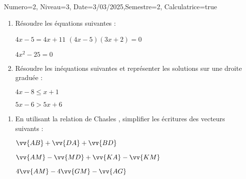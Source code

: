 \documentclass[a4paper,12pt]{article}
\begin{document}
\begin{Maquette}[DS]{Numero=2, Niveau=3, Date=3/03/2025,Semestre=2, Calculatrice=true}

\begin{exercice}
\begin{enumerate}
\item{} Résoudre les équations suivantes :
\begin{multicols}{3}
$4x-5=4x+11$ \newline
\anserline[6]
\columnbreak
$(4x-5)(3x+2)=0$\newline
\anserline[6]
\columnbreak

$4x^{2}-25=0$\newline
\anserline[6]
\end{multicols}
\item{} Résoudre les inéquations suivantes et représenter les solutions sur une droite graduée :
\begin{multicols}{2}
$4x-8\leq x+1$ \newline
\anserline[6]
\columnbreak

$5x-6 > 5x+6$\newline
\anserline[6]
\end{multicols}
\end{enumerate}
\end{exercice}

\begin{exercice}
\begin{enumerate}
\item{} En utilisant la relation de Chasles , simplifier les écritures des vecteurs suivants :
\begin{multicols}{3}
\(
\vv{AB}+\vv{DA}+\vv{BD}\)\newline
\anserline[4]
\columnbreak

\( \vv{AM}-\vv{MD}+\vv{KA}-\vv{KM}\)\newline
\anserline[4]
\columnbreak

\( 4\vv{AM}-4\vv{GM}-\vv{AG}\)\newline
\anserline[4]
\end{multicols}

\end{enumerate}
\end{exercice}


\end{Maquette}
\end{document}
